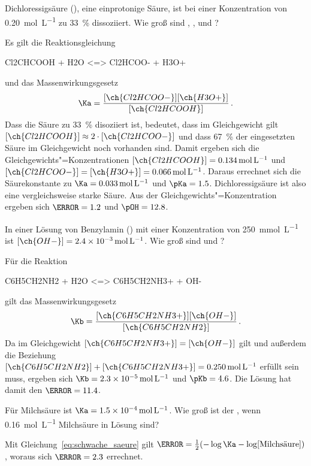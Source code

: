 \documentclass{scrartcl}
\begin{document}
\begin{question}
  Dichloressigsäure (), eine einprotonige Säure, ist bei einer
  Konzentration von \SI{.20}{\mole\per\liter} zu \SI{33}{\percent}
  dissoziiert.  Wie groß sind \Ka, \pKa, \pH{} und \pOH?
\end{question}
\begin{solution}
  Es gilt die Reaktionsgleichung
  \begin{reaction*}
    Cl2CHCOOH + H2O <=> Cl2HCOO- + H3O+
  \end{reaction*}
  und das Massenwirkungsgesetz
  \[
    \Ka = \frac{[\ch{Cl2HCOO-}][\ch{H3O+}]}{[\ch{Cl2HCOOH}]} \,.
  \]
  Dass die Säure zu \SI{33}{\percent} disoziiert ist, bedeutet, dass
  im Gleichgewicht gilt $[\ch{Cl2HCOOH}] \approx 2\cdot[\ch{Cl2HCOO-}]$ und
  dass \SI{67}{\percent} der eingesetzten Säure im Gleichgewicht noch
  vorhanden sind.  Damit ergeben sich die Gleichgewichts"=Konzentrationen
  $[\ch{Cl2HCOOH}] = \SI{.134}{\mole\per\liter}$ und $[\ch{Cl2HCOO-}] =
  [\ch{H3O+}] = \SI{0.066}{\mole\per\liter}$.  Daraus errechnet sich die
  Säurekonstante zu $\Ka = \SI{0.033}{\mole\per\liter}$ und $\pKa = 1.5$.
  Dichloressigsäure ist also eine vergleichsweise starke Säure.  Aus der
  Gleichgewichts"=Konzentration ergeben sich $\pH = 1.2$ und $\pOH = 12.8$.
\end{solution}

\begin{question}
  In einer Lösung von Benzylamin () mit einer Konzentration von
  \SI{250}{\milli\mole\per\liter} ist \([\ch{OH-}] =
  \SI{2.4e-3}{\mole\per\liter}\).  Wie groß sind \pKb{} und \pH?
\end{question}
\begin{solution}
  Für die Reaktion
  \begin{reaction*}
    C6H5CH2NH2 + H2O <=> C6H5CH2NH3+ + OH-
  \end{reaction*}
  gilt das Massenwirkungsgesetz
  \[
    \Kb = \frac{[\ch{C6H5CH2NH3+}][\ch{OH-}]}{[\ch{C6H5CH2NH2}]} \,.
  \]
  Da im Gleichgewicht $[\ch{C6H5CH2NH3+}] = [\ch{OH-}]$ gilt und außerdem die
  Beziehung $[\ch{C6H5CH2NH2}] + [\ch{C6H5CH2NH3+}] =
  \SI{0.250}{\mole\per\liter}$ erfüllt sein muss, ergeben sich $\Kb =
  \SI{2.3e-5}{\mole\per\liter}$ und $\pKb = 4.6$.  Die Lösung hat damit den
  $\pH = 11.4$.
\end{solution}

\begin{question}
  Für Milchsäure ist $\Ka = \SI{1.5e-4}{\mole\per\liter}$.  Wie groß ist der
  \pH, wenn \SI{.16}{\mole\per\liter} Milchsäure in Lösung sind?
\end{question}
\begin{solution}
  Mit Gleichung~\eqref{eq:schwache_saeure} gilt $\pH = \frac{1}{2}(-\log\Ka -
  \log[\text{Milchsäure}])$, woraus sich $\pH = 2.3$ errechnet.
\end{solution}
\end{document}
